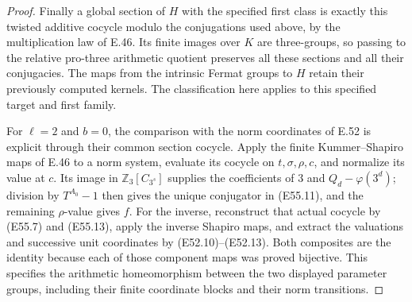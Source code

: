 \begin{proof}
Finally a global section of $H$ with the specified first
class is exactly this twisted additive cocycle modulo
the conjugations used above, by the multiplication law
of E.46. Its finite images over $K$ are three-groups,
so passing to the relative pro-three arithmetic quotient
preserves all these sections and all their conjugacies.
The maps from the intrinsic Fermat groups to $H$ retain
their previously computed kernels. The classification
here applies to this specified target and first family.

For $\ell=2$ and $b=0$, the comparison with the norm
coordinates of E.52 is explicit through their common
section cocycle. Apply the finite Kummer--Shapiro maps
of E.46 to a norm system, evaluate its cocycle on
$t,\sigma,\rho,c$, and normalize its value at $c$.
Its image in $\mathbb Z_3[C_{3^s}]$ supplies the
coefficients of $3$ and $Q_d-\varphi(3^d)$; division
by $T^{A_0}-1$ then gives the unique conjugator in
(E55.11), and the remaining $\rho$-value gives $f$.
For the inverse, reconstruct that actual cocycle by
(E55.7) and (E55.13), apply the inverse Shapiro maps,
and extract the valuations and successive unit
coordinates by (E52.10)--(E52.13). Both composites
are the identity because each of those component
maps was proved bijective. This specifies the
arithmetic homeomorphism between the two displayed
parameter groups, including their finite coordinate
blocks and their norm transitions.
\end{proof}
